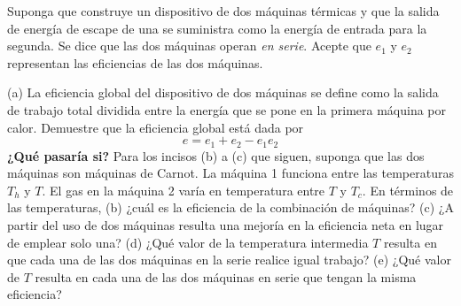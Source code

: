 \item Suponga que construye un dispositivo de dos máquinas térmicas y que la salida de energía de escape de una se suministra como la energía de entrada para la segunda. Se dice que las dos máquinas operan \textit{en serie}. Acepte que $e_1$ y $e_2$ representan las eficiencias de las dos máquinas. 

(a) La eficiencia global del dispositivo de dos máquinas se define como la salida de trabajo total dividida entre la energía que se pone en la primera máquina por calor. Demuestre que la eficiencia global está dada por
$$ e = e_1 + e_2 - e_1 e_2 $$
\textbf{¿Qué pasaría si?} Para los incisos (b) a (c) que siguen, suponga que las dos máquinas son máquinas de Carnot. La máquina 1 funciona entre las temperaturas $T_h$ y $T$. El gas en la máquina 2 varía en temperatura entre $T$ y $T_c$. En términos de las temperaturas, 
(b) ¿cuál es la eficiencia de la combinación de máquinas? 
(c) ¿A partir del uso de dos máquinas resulta una mejoría en la eficiencia neta en lugar de emplear solo una? 
(d) ¿Qué valor de la temperatura intermedia $T$ resulta en que cada una de las dos máquinas en la serie realice igual trabajo? 
(e) ¿Qué valor de $T$ resulta en cada una de las dos máquinas en serie que tengan la misma eficiencia?
